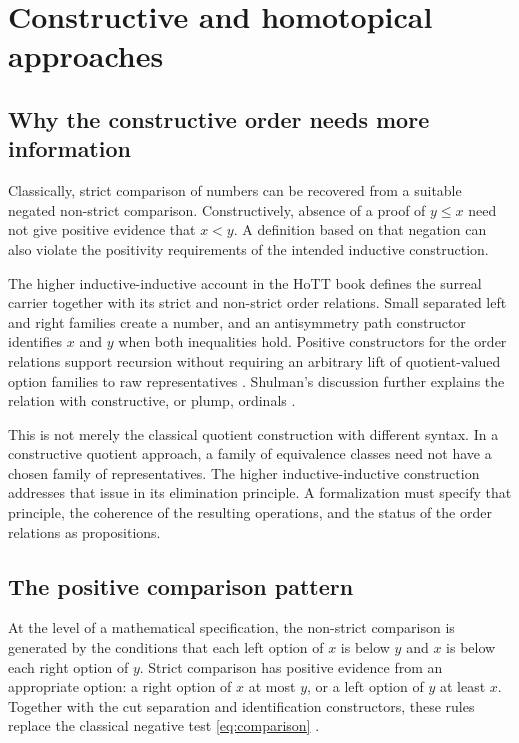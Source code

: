 \documentclass[11pt,letterpaper]{article}
\numberwithin{equation}{section}
\theoremstyle{definition}
\theoremstyle{remark}
\begin{document}
\section{Constructive and homotopical approaches}\label{sec:hott}

\subsection{Why the constructive order needs more information}
Classically, strict comparison of numbers can be recovered from a suitable negated non-strict comparison. Constructively, absence of a proof of $y\le x$ need not give positive evidence that $x<y$. A definition based on that negation can also violate the positivity requirements of the intended inductive construction.

The higher inductive-inductive account in the HoTT book defines the surreal carrier together with its strict and non-strict order relations. Small separated left and right families create a number, and an antisymmetry path constructor identifies $x$ and $y$ when both inequalities hold. Positive constructors for the order relations support recursion without requiring an arbitrary lift of quotient-valued option families to raw representatives \cite{HoTT}. Shulman's discussion further explains the relation with constructive, or plump, ordinals \cite{Shulman}.

This is not merely the classical quotient construction with different syntax. In a constructive quotient approach, a family of equivalence classes need not have a chosen family of representatives. The higher inductive-inductive construction addresses that issue in its elimination principle. A formalization must specify that principle, the coherence of the resulting operations, and the status of the order relations as propositions.

\subsection{The positive comparison pattern}
At the level of a mathematical specification, the non-strict comparison is generated by the conditions that each left option of $x$ is below $y$ and $x$ is below each right option of $y$. Strict comparison has positive evidence from an appropriate option: a right option of $x$ at most $y$, or a left option of $y$ at least $x$. Together with the cut separation and identification constructors, these rules replace the classical negative test \eqref{eq:comparison} \cite{Shulman}.
\end{document}
